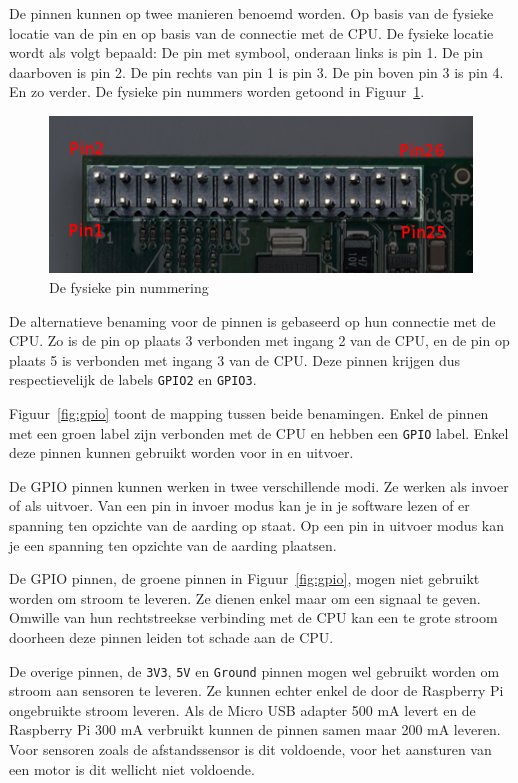 \documentclass[a4paper]{article}
\begin{document}
      De pinnen kunnen op twee manieren benoemd worden.  Op basis van
de fysieke locatie van de pin en op basis van de connectie met de CPU.
De fysieke locatie wordt als volgt bepaald: De pin met symbool, 
onderaan links is pin 1. De pin daarboven is pin 2.  De pin rechts van
pin 1 is pin 3.  De pin boven pin 3 is pin 4.  En zo verder.  De
fysieke pin nummers worden getoond in Figuur~\ref{fig:gpio:physical}.

      \begin{figure}[h!]
        \centering
        \includegraphics[width=.8\textwidth]{images/gpio-physical.png}
        \caption{De fysieke pin nummering}
        \label{fig:gpio:physical}
      \end{figure}

      De alternatieve benaming voor de pinnen is gebaseerd op hun
connectie met de CPU.  Zo is de pin op plaats 3 verbonden met ingang 2
van de CPU, en de pin op plaats 5 is verbonden met ingang 3 van de
CPU.  Deze pinnen krijgen dus respectievelijk de labels \texttt{GPIO2}
en \texttt{GPIO3}.

      Figuur~\ref{fig:gpio} toont de mapping tussen beide benamingen.
Enkel de pinnen met een groen label zijn verbonden met de CPU en
hebben een \texttt{GPIO} label.  Enkel deze pinnen kunnen gebruikt
worden voor in en uitvoer.

      De GPIO pinnen kunnen werken in twee verschillende modi.  Ze
werken als invoer of als uitvoer.  Van een pin in invoer modus kan je
in je software lezen of er spanning ten opzichte van de aarding op
staat.  Op een pin in uitvoer modus kan je een spanning ten opzichte
van de aarding plaatsen.

      De GPIO pinnen, de groene pinnen in Figuur~\ref{fig:gpio}, mogen
niet gebruikt worden om stroom te leveren.  Ze dienen enkel maar om
een signaal te geven.  Omwille van hun rechtstreekse verbinding met de
CPU kan een te grote stroom doorheen deze pinnen leiden tot schade aan
de CPU.

      De overige pinnen, de \texttt{3V3}, \texttt{5V} en
\texttt{Ground} pinnen mogen wel gebruikt worden om stroom aan
sensoren te leveren.  Ze kunnen echter enkel de door de Raspberry Pi
ongebruikte stroom leveren.  Als de Micro USB adapter 500 mA levert en
de Raspberry Pi 300 mA verbruikt kunnen de pinnen samen maar 200 mA
leveren.  Voor sensoren zoals de afstandssensor is dit voldoende, voor
het aansturen van een motor is dit wellicht niet voldoende.
\end{document}
